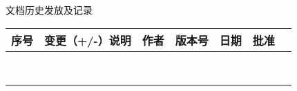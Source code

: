 \documentclass[12pt,a4paper,UTF8]{ctexart}
\begin{document}
\centering
\fontsize{20pt}{24pt}文档历史发放及记录\\
\quad    
\begin{table}[h]
	\begin{center} %
		\begin{tabular}{|c|C{5cm}|c|c|c|c|c|}%
		\hline
		\textbf{ 序号 }&\textbf{     变更（+/-）说明      }&\textbf{   作者   }&\textbf{版本号}&\textbf{  日期  }&\textbf{  批准  }\\ 
		\hline
		 & & & & & \\
		\hline
		 & & & & & \\
		\hline
		 & & & & & \\
		\hline
		 & & & & & \\
		\hline
		 & & & & & \\
		\hline
		 & & & & & \\
		\hline
		 & & & & & \\
		\hline
		 & & & & & \\
		\hline
		\end{tabular}
	\end{center}
\end{table}
\end{document}
